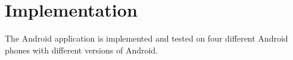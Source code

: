 \section{Implementation}
The Android application is implemented and tested on four different Android phones with different versions of Android.

